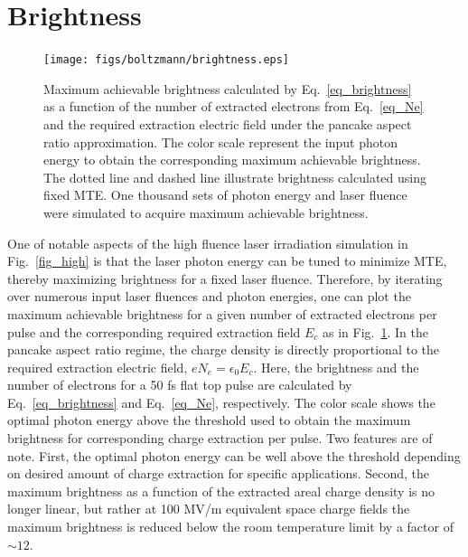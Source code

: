 \section{Brightness}

\begin{figure}
	\texttt{[image: figs/boltzmann/brightness.eps]}
	\caption{Maximum achievable brightness calculated by Eq.~\ref{eq_brightness} as a function of the number of extracted electrons from Eq.~\ref{eq_Ne} and the required extraction electric field under the pancake aspect ratio approximation.\cite{pancake,rethfeld_schottky} The color scale represent the input photon energy to obtain the corresponding maximum achievable brightness. The dotted line and dashed line illustrate brightness calculated using fixed MTE. One thousand sets of photon energy and laser fluence were simulated to acquire maximum achievable brightness.}
	\label{fig_brightness}
\end{figure}

One of notable aspects of the high fluence laser irradiation simulation in Fig.~\ref{fig_high} is that the laser photon energy can be tuned to minimize MTE, thereby maximizing brightness for a fixed laser fluence. Therefore, by iterating over numerous input laser fluences and photon energies, one can plot the maximum achievable brightness for a given number of extracted electrons per pulse and the corresponding required extraction field $E_c$ as in Fig.~\ref{fig_brightness}.
In the pancake aspect ratio regime, the charge density is directly proportional to the required extraction electric field, $e N_e = \epsilon_0 E_c$.\cite{pancake,rethfeld_schottky}
Here, the brightness and the number of electrons for a 50 fs flat top pulse are calculated by Eq.~\ref{eq_brightness} and Eq.~\ref{eq_Ne}, respectively. The color scale shows the optimal photon energy above the threshold used to obtain the maximum brightness for corresponding charge extraction per pulse. Two features are of note. First, the optimal photon energy can be well above the threshold depending on desired amount of charge extraction for specific applications. Second, the maximum brightness as a function of the extracted areal charge density is no longer linear, but rather at 100 MV/m equivalent space charge fields the maximum brightness is reduced below the room temperature limit by a factor of $\sim 12$.




